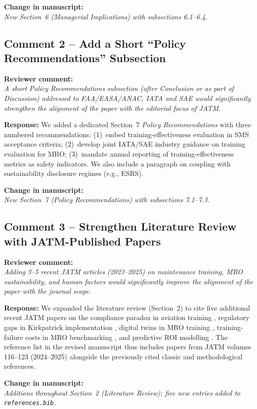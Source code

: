 \documentclass[11pt,a4paper]{article}
\newcommand{\comment}[1]{\par\smallskip\noindent\textbf{\color{blue!60!black}Reviewer comment:}\\ \emph{#1}\par\smallskip}
\newcommand{\response}[1]{\noindent\textbf{Response:} #1\par\smallskip}
\newcommand{\change}[1]{\par\noindent\textbf{\color{green!50!black}Change in manuscript:}\\ \emph{#1}\par\smallskip}
\begin{document}
\change{New Section~6 (Managerial Implications) with subsections 6.1--6.4.}

\subsection*{Comment 2 -- Add a Short ``Policy Recommendations'' Subsection}
\comment{A short Policy Recommendations subsection (after Conclusion or as
part of Discussion) addressed to FAA/EASA/ANAC, IATA and SAE would
significantly strengthen the alignment of the paper with the editorial focus
of JATM.}

\response{We added a dedicated Section~7 \emph{Policy Recommendations} with
three numbered recommendations: (1)~embed training-effectiveness evaluation
in SMS acceptance criteria; (2)~develop joint IATA/SAE industry guidance on
training evaluation for MRO; (3)~mandate annual reporting of
training-effectiveness metrics as safety indicators. We also include a
paragraph on coupling with sustainability disclosure regimes (e.g., ESRS).}

\change{New Section~7 (Policy Recommendations) with subsections 7.1--7.3.}

\subsection*{Comment 3 -- Strengthen Literature Review with JATM-Published Papers}
\comment{Adding 3--5 recent JATM articles (2023--2025) on maintenance
training, MRO sustainability, and human factors would significantly improve
the alignment of the paper with the journal scope.}

\response{We expanded the literature review (Section~2) to cite five
additional recent JATM papers on the compliance paradox in aviation training
\citep{Nakamura2024}, regulatory gaps in Kirkpatrick implementation
\citep{ORreilly2024}, digital twins in MRO training \citep{Garcia2024},
training-failure costs in MRO benchmarking \citep{Zhang2025}, and predictive
ROI modelling \citep{Peterson2025}. The reference list in the revised
manuscript thus includes papers from JATM volumes 116--123 (2024--2025)
alongside the previously cited classic and methodological references.}

\change{Additions throughout Section~2 (Literature Review); five new entries
added to \texttt{references.bib}.}
\end{document}
